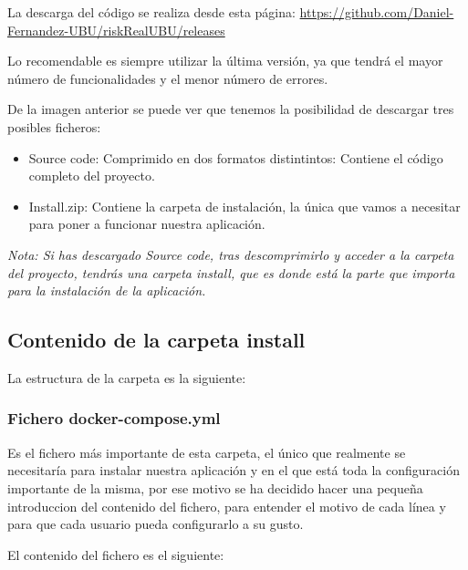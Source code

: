 La descarga del código se realiza desde esta página: \url{https://github.com/Daniel-Fernandez-UBU/riskRealUBU/releases}


Lo recomendable es siempre utilizar la última versión, ya que tendrá el mayor número de funcionalidades y el menor número de errores.

De la imagen anterior se puede ver que tenemos la posibilidad de descargar tres posibles ficheros:

\begin{itemize}
	\item Source code: Comprimido en dos formatos distintintos: Contiene el código completo del proyecto.
	\item Install.zip: Contiene la carpeta de instalación, la única que vamos a necesitar para poner a funcionar nuestra aplicación.
\end{itemize}

\textit{Nota: Si has descargado Source code, tras descomprimirlo y acceder a la carpeta del proyecto, tendrás una carpeta install, que es donde está la parte que importa para la instalación de la aplicación.}

\subsection{Contenido de la carpeta install}

La estructura de la carpeta es la siguiente:


\subsubsection{Fichero docker-compose.yml}

Es el fichero más importante de esta carpeta, el único que realmente se necesitaría para instalar nuestra aplicación y en el que está toda la configuración importante de la misma, por ese motivo se ha decidido hacer una pequeña introduccion del contenido del fichero, para entender el motivo de cada línea y para que cada usuario pueda configurarlo a su gusto.

El contenido del fichero es el siguiente:

